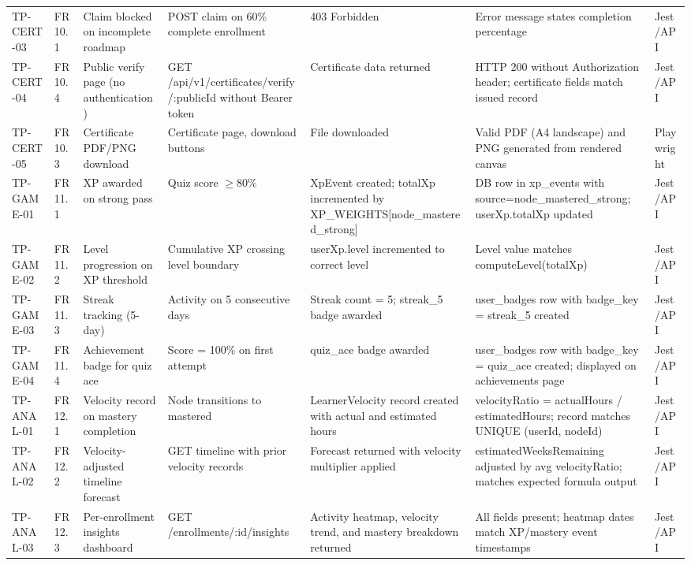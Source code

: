 \begin{longtable}{p{1.8cm}p{1.5cm}p{2.2cm}p{2.2cm}p{2.5cm}p{1.8cm}p{1.2cm}}
TP-CERT-03 & FR10.1 & Claim blocked on incomplete roadmap & POST claim on 60\% complete enrollment & 403 Forbidden & Error message states completion percentage & Jest/API \\
TP-CERT-04 & FR10.4 & Public verify page (no authentication) & GET /api/v1/certificates/verify/:publicId without Bearer token & Certificate data returned & HTTP 200 without Authorization header; certificate fields match issued record & Jest/API \\
TP-CERT-05 & FR10.3 & Certificate PDF/PNG download & Certificate page, download buttons & File downloaded & Valid PDF (A4 landscape) and PNG generated from rendered canvas & Playwright \\
TP-GAME-01 & FR11.1 & XP awarded on strong pass & Quiz score $\ge 80\%$ & XpEvent created; totalXp incremented by XP\_WEIGHTS[node\_mastered\_strong] & DB row in xp\_events with source=node\_mastered\_strong; userXp.totalXp updated & Jest/API \\
TP-GAME-02 & FR11.2 & Level progression on XP threshold & Cumulative XP crossing level boundary & userXp.level incremented to correct level & Level value matches computeLevel(totalXp) & Jest/API \\
TP-GAME-03 & FR11.3 & Streak tracking (5-day) & Activity on 5 consecutive days & Streak count = 5; streak\_5 badge awarded & user\_badges row with badge\_key = streak\_5 created & Jest/API \\
TP-GAME-04 & FR11.4 & Achievement badge for quiz ace & Score = 100\% on first attempt & quiz\_ace badge awarded & user\_badges row with badge\_key = quiz\_ace created; displayed on achievements page & Jest/API \\
TP-ANAL-01 & FR12.1 & Velocity record on mastery completion & Node transitions to mastered & LearnerVelocity record created with actual and estimated hours & velocityRatio = actualHours / estimatedHours; record matches UNIQUE (userId, nodeId) & Jest/API \\
TP-ANAL-02 & FR12.2 & Velocity-adjusted timeline forecast & GET timeline with prior velocity records & Forecast returned with velocity multiplier applied & estimatedWeeksRemaining adjusted by avg velocityRatio; matches expected formula output & Jest/API \\
TP-ANAL-03 & FR12.3 & Per-enrollment insights dashboard & GET /enrollments/:id/insights & Activity heatmap, velocity trend, and mastery breakdown returned & All fields present; heatmap dates match XP/mastery event timestamps & Jest/API \\

\end{longtable}
